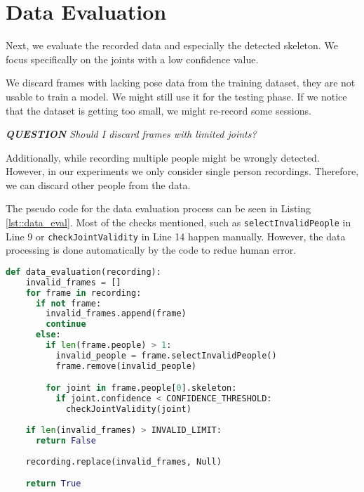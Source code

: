 \section{Data Evaluation}

Next, we evaluate the recorded data and especially the detected skeleton. We focus specifically on the joints with a low confidence value. 

We discard frames with lacking pose data from the training dataset, they are not usable to train a model. We might still use it for the testing phase. If we notice that the dataset is getting too small, we might re-record some sessions.

\textit{\textbf{QUESTION} Should I discard frames with limited joints?}

Additionally, while recording multiple people might be wrongly detected. However, in our experiments we only consider single person recordings. Therefore, we can discard other people from the data.

The pseudo code for the data evaluation process can be seen in Listing \ref{lst::data_eval}. Most of the checks mentioned, such as \texttt{selectInvalidPeople} in Line 9 or \texttt{checkJointValidity} in Line 14 happen manually. However, the data processing is done automatically by the code to redue human error.

\begin{lstlisting}[language=python,
                    firstnumber=1,
                    caption={[Pseudo code for data evaluation]{Pseudo code for data evaluation}},
                    label={lst:data_eval}]
  def data_evaluation(recording):
    invalid_frames = []
    for frame in recording:
      if not frame:
        invalid_frames.append(frame)
        continue
      else:
        if len(frame.people) > 1:
          invalid_people = frame.selectInvalidPeople()
          frame.remove(invalid_people)

        for joint in frame.people[0].skeleton:
          if joint.confidence < CONFIDENCE_THRESHOLD:
            checkJointValidity(joint)
    
    if len(invalid_frames) > INVALID_LIMIT:
      return False
    
    recording.replace(invalid_frames, Null)

    return True
\end{lstlisting}
